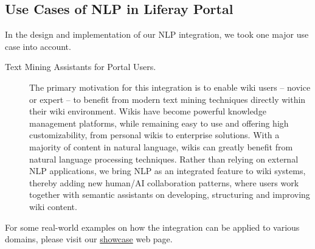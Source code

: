 \subsection{Use Cases of NLP in Liferay Portal}
In the design and implementation of our NLP integration, we took one major use case into account.

\begin{description}
\item[Text Mining Assistants for Portal Users.] 


The primary motivation for this integration is to enable wiki users -- novice or expert -- to benefit from modern text mining techniques directly within their wiki environment. Wikis have become powerful knowledge management platforms, while remaining easy to use and offering high customizability, from personal wikis to enterprise solutions. With a majority of content in natural language, wikis can greatly benefit from natural language processing techniques. Rather than relying on external NLP applications, we bring NLP as an integrated feature to wiki systems, thereby adding new human/AI collaboration patterns, where users work together with semantic assistants on developing, structuring and improving wiki content.

\end{description}

\noindent
For some real-world examples on how the \wikinlp integration can be applied to
various domains, please visit our
\href{http://www.semanticsoftware.info/semantic-assistants-wiki-nlp-showcase}{showcase}
web page.

